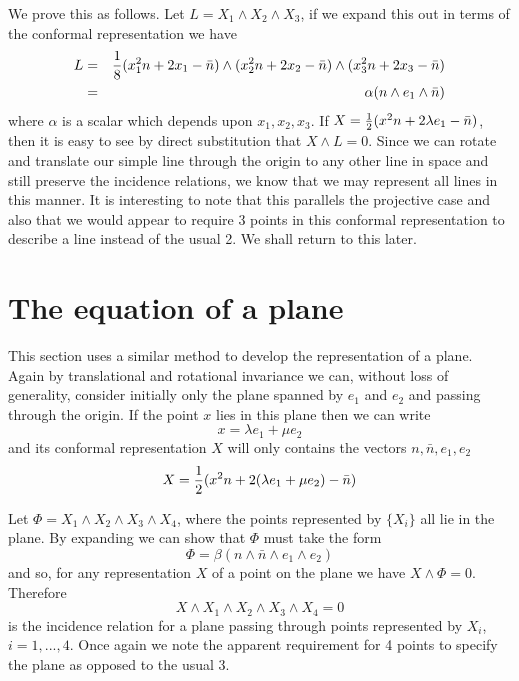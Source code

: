 We prove this as follows. Let $L=X_1\wedge X_2\wedge X_3$,
if we expand this out in terms of the conformal
representation we have
%
\begin{eqnarray}
 L & = & \frac{1}{8}(x_1^2n + 2x_1-\bar{n})\wedge (x_2^2n + 2x_2-\bar{n})\wedge (x_3^2n
+ 2x_3-\bar{n})\nonumber \\
   & = & \alpha (n\wedge e_1 \wedge \bar{n})
\end{eqnarray}
%
where $\alpha$ is a scalar which depends upon $x_1,x_2,x_3$.
If $X = \frac{1}{2}(x^2n + 2\lambda e_1 - \bar{n})$, then it is easy to see by
direct substitution that $X\wedge L = 0$. Since we can rotate and
translate our simple line through the origin to any other
line in space and still preserve the incidence relations,
we know that we may represent all lines in this manner. It is
interesting to note that this parallels the projective case
and also that we would appear to require 3 points in this
conformal representation to describe a line instead of the usual
2. We shall return to this later.

\section{The equation of a plane}

This section uses a similar method to develop the representation
of a plane. Again by translational and rotational invariance we can, 
without loss of generality, consider initially only the plane spanned
by $e_1$ and $e_2$ and passing through the origin. If the point $x$ 
lies in this plane then we can write
%
\[  x = \lambda e_1 + \mu e_2  \]
%
and its conformal representation $X$ will only
contains the vectors  $n,\bar{n},e_1,e_2$
%
\[ X =  \frac{1}{2}(x^2n + 2(\lambda e_1 + \mu e_2) - \bar{n})  \]

Let $\Phi = X_1 \wedge X_2 \wedge X_3 \wedge X_4$, where the points represented
by $\{X_i\}$ all lie in the plane. By expanding we can show that 
$\Phi$ must take the form
%
\[  \Phi = \beta (n\wedge \bar{n} \wedge e_1 \wedge e_2)  \]
%
and so, for any representation $X$ of a point on the plane we have 
$X\wedge \Phi = 0$. Therefore
%
\begin{equation}
     X\wedge X_1 \wedge X_2 \wedge X_3 \wedge X_4 = 0
     \end{equation}
%
is the incidence relation for a plane passing through points represented by
$X_i$, $i=1,...,4$. Once again we note the apparent requirement for
4 points to specify the plane as opposed to the usual 3.

